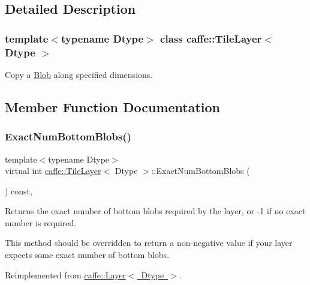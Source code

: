 \subsection{Detailed Description}
\subsubsection*{template$<$typename Dtype$>$\newline
class caffe\+::\+Tile\+Layer$<$ Dtype $>$}

Copy a \mbox{\hyperlink{classcaffe_1_1_blob}{Blob}} along specified dimensions. 

\subsection{Member Function Documentation}
\mbox{\label{classcaffe_1_1_tile_layer_ac7e0da0e543f134e04b00d8625132b71}} 
\subsubsection{\texorpdfstring{Exact\+Num\+Bottom\+Blobs()}{ExactNumBottomBlobs()}\hspace{0.1cm}{\footnotesize\ttfamily [1/2]}}
{\footnotesize\ttfamily template$<$typename Dtype$>$ \\
virtual int \mbox{\hyperlink{classcaffe_1_1_tile_layer}{caffe\+::\+Tile\+Layer}}$<$ Dtype $>$\+::Exact\+Num\+Bottom\+Blobs (\begin{DoxyParamCaption}{ }\end{DoxyParamCaption}) const\hspace{0.3cm}{\ttfamily [inline]}, {\ttfamily [virtual]}}



Returns the exact number of bottom blobs required by the layer, or -\/1 if no exact number is required. 

This method should be overridden to return a non-\/negative value if your layer expects some exact number of bottom blobs. 

Reimplemented from \mbox{\hyperlink{classcaffe_1_1_layer_a8e5ee0494d85f5f55fc4396537cbc60f}{caffe\+::\+Layer$<$ Dtype $>$}}.

\mbox{\label{classcaffe_1_1_tile_layer_ac7e0da0e543f134e04b00d8625132b71}} 
